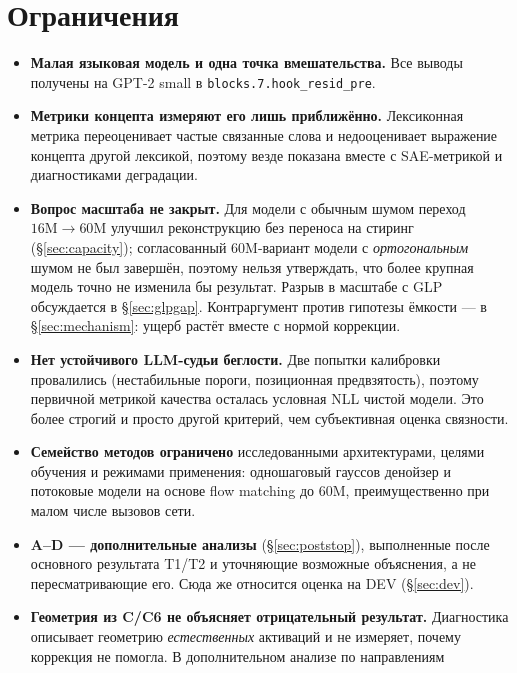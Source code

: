 \documentclass[10pt,a4paper]{article}
\begin{document}
\section{Ограничения}\label{sec:limits}

\begin{itemize}
  \item \textbf{Малая языковая модель и одна точка вмешательства.} Все выводы
    получены на GPT-2 small в \texttt{blocks.7.hook\_resid\_pre}.
  \item \textbf{Метрики концепта измеряют его лишь приближённо.} Лексиконная
    метрика переоценивает частые связанные слова и недооценивает выражение
    концепта другой лексикой, поэтому везде показана вместе с SAE-метрикой и
    диагностиками деградации.
  \item \textbf{Вопрос масштаба не закрыт.} Для модели с обычным шумом переход
    $16\text{M} \to 60\text{M}$ улучшил реконструкцию без переноса на стиринг
    (\S\ref{sec:capacity}); согласованный 60M-вариант модели с \emph{ортогональным}
    шумом не был завершён, поэтому нельзя утверждать, что более крупная модель
    точно не изменила бы результат. Разрыв в масштабе с GLP обсуждается в
    \S\ref{sec:glpgap}. Контраргумент против гипотезы ёмкости — в
    \S\ref{sec:mechanism}: ущерб растёт вместе с нормой коррекции.
  \item \textbf{Нет устойчивого LLM-судьи беглости.} Две попытки калибровки
    провалились (нестабильные пороги, позиционная предвзятость), поэтому
    первичной метрикой качества осталась условная NLL чистой модели. Это более
    строгий и просто другой критерий, чем субъективная оценка связности.
  \item \textbf{Семейство методов ограничено} исследованными архитектурами,
    целями обучения и режимами применения: одношаговый гауссов денойзер и
    потоковые модели на основе flow matching до 60M, преимущественно при малом
    числе вызовов сети.
  \item \textbf{A--D — дополнительные анализы} (\S\ref{sec:poststop}), выполненные
    после основного результата T1/T2 и уточняющие возможные объяснения, а не
    пересматривающие его. Сюда же относится оценка на DEV (\S\ref{sec:dev}).
  \item \textbf{Геометрия из C/C6 не объясняет отрицательный результат.}
    Диагностика описывает геометрию \emph{естественных} активаций и не измеряет,
    почему коррекция не помогла. В дополнительном анализе по направлениям

\end{itemize}
\end{document}
